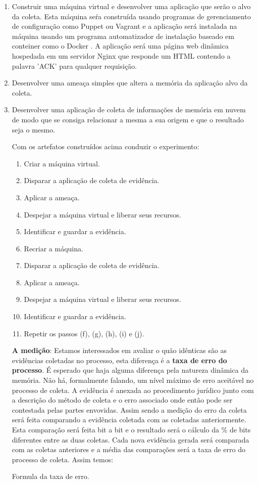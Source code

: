 \documentclass[12pt,				%
	openright,			%
	oneside,			%
	a4paper,			%
	english,			%
	brazil				%
	]{abntex2}
\begin{document}
\begin{enumerate}
 \item Construir uma máquina virtual e desenvolver uma aplicação que serão o alvo da coleta. Esta máquina seŕa construída usando programas de gerenciamento de configuração como
 Puppet \cite{Wikipedia2015} ou Vagrant\cite{Wikipedia2016} e a aplicação será instalada na máquina usando um programa automatizador de instalação baseado em 
 conteiner como o Docker \cite{Wikipedia2016a}. A aplicação será uma página web dinâmica hospedada em um servidor Nginx que responde um HTML contendo a palavra 'ACK' 
 para qualquer requisição.
 
 \item Desenvolver uma ameaça simples que altera a memória da aplicação alvo da coleta.
 
 \item Desenvolver uma aplicação de coleta de informações de memória em nuvem de modo que se consiga relacionar a mesma a sua origem e que o resultado seja o mesmo.
 
 Com os artefatos construídos acima conduzir o experimento:

\begin{enumerate}
 \item Criar a máquina virtual.
 \item Disparar a aplicação de coleta de evidência.
 \item Aplicar a ameaça.
 \item Despejar a máquina virtual e liberar seus recursos.
 \item Identificar e guardar a evidência.
 \item Recriar a máquina.
 \item Disparar a aplicação de coleta de evidência. 
 \item Aplicar a ameaça.
 \item Despejar a máquina virtual e liberar seus recursos.
 \item Identificar e guardar a evidência.
 \item Repetir os passos (f), (g), (h), (i) e (j).
\end{enumerate}

\textbf{A medição}: Estamos interessados em avaliar o quão idênticas são as evidências coletadas no processo, esta diferença é a \textbf{taxa de erro do processo}. É esperado 
que haja alguma diferença pela natureza dinâmica da memória. Não há, formalmente falando, um nível máximo de erro aceitável no processo de coleta. A evidência é anexada ao procedimento
jurídico junto com a descrição do método de coleta e o erro associado onde então pode ser contestada pelas partes envovidas. Assim sendo a medição do erro da coleta será feita 
comparando a evidência coletada com as coletadas anteriormente. Esta comparação será feita bit a bit e o resultado será o cálculo da \% de bits diferentes entre as duas coletas. 
Cada nova evidência gerada será comparada com as coletas anteriores e a média das comparações será a taxa de erro do processo de coleta. Assim temos:

Formula da taxa de erro.

\end{enumerate}
\end{document}
